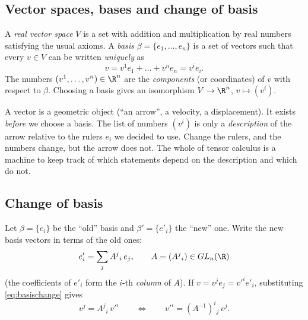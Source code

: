\subsection{Vector spaces, bases and change of basis}\label{sec:vs}


\begin{formal}
A \emph{real vector space} $V$ is a set with addition and multiplication by real numbers satisfying the usual axioms. A \emph{basis} $\beta=\{e_1,\dots,e_n\}$ is a set of vectors such that every $v\in V$ can be written \emph{uniquely} as
\[
v=v^1e_1+\dots+v^ne_n = v^ie_i .
\]
The numbers $(v^1,\dots,v^n)\in\R^n$ are the \emph{components} (or coordinates) of $v$ with respect to $\beta$. Choosing a basis gives an isomorphism $V\to\R^n$, $v\mapsto (v^i)$.
\end{formal}

\begin{intuition}
A vector is a geometric object (``an arrow'', a velocity, a displacement). It exists \emph{before} we choose a basis. The list of numbers $(v^i)$ is only a \emph{description} of the arrow relative to the rulers $e_i$ we decided to use. Change the rulers, and the numbers change, but the arrow does not. The whole of tensor calculus is a machine to keep track of which statements depend on the description and which do not.
\end{intuition}

\subsection*{Change of basis}
Let $\beta=\{e_i\}$ be the ``old'' basis and $\beta'=\{e'_i\}$ the ``new'' one. Write the new basis vectors in terms of the old ones:
\begin{equation}\label{eq:basischange}
e'_i=\sum_j A^j{}_i\, e_j ,\qquad A=(A^j{}_i)\in GL_n(\R)
\end{equation}
(the coefficients of $e'_i$ form the $i$-th \emph{column} of $A$). If $v=v^je_j=v'^ie'_i$, substituting \eqref{eq:basischange} gives
\begin{equation}\label{eq:compchange}
v^j=A^j{}_i\,v'^i\qquad\Longleftrightarrow\qquad v'^i=(A^{-1})^i{}_j\,v^j .
\end{equation}

